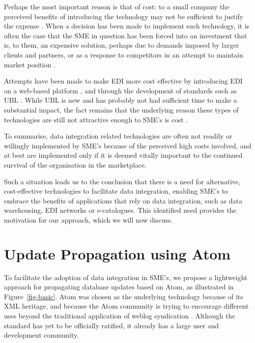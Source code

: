 \documentclass{CRPITStyle}
\begin{document}
Perhaps the most important reason is that of cost: to a small company
the perceived benefits of introducing the technology may not be
sufficient to justify the expense
\cite{Beck-R-2002-Bled,Guo-J-2003-DocEng,Somm-RA-2002-SIGMOD}. When a
decision has been made to implement such technology, it is often the
case that the SME in question has been forced into an investment that
is, to them, an expensive solution, perhaps due to demands imposed by
larger clients and partners, or as a response to competitors in an
attempt to maintain market position
\cite{Beck-R-2002-Bled,vaHe-E-1999-EDI}.

Attempts have been made to make EDI more cost effective by introducing
EDI on a web-based platform \cite{Beck-R-2002-Bled}, and through the
development of standards such as UBL \cite{Mead-B-2004-UBL}. While UBL
is new and has probably not had sufficient time to make a substantial
impact, the fact remains that the underlying reason these types of
technologies are still not attractive enough to SME's is cost
\cite{Beck-R-2002-Bled,Guo-J-2003-DocEng,Somm-RA-2002-SIGMOD,vaHe-E-1999-EDI}.

To summarise, data integration related technologies are often not
readily or willingly implemented by SME's because of the perceived high
costs involved, and at best are implemented only if it is deemed vitally
important to the continued survival of the organisation in the
marketplace.

Such a situation leads us to the conclusion that there is a need for
alternative, cost-effective technologies to facilitate data integration,
enabling SME's to embrace the benefits of applications that rely on data
integration, such as data warehousing, EDI networks or e-catalogues.
This identified need provides the motivation for our approach, which we
will now discuss.


\section{Update Propagation using Atom}
\label{sec-architecture}

To facilitate the adoption of data integration in SME's, we propose a
lightweight approach for propagating database updates based on Atom,
as illustrated in Figure~\ref{fig-basic}. Atom was chosen as the
underlying technology because of its XML heritage, and because the Atom
community is trying to encourage different uses beyond
the traditional application of weblog syndication
\cite{Nott-M-2005-Atom}. Although the standard has yet to be officially
ratified, it already has a large user and development community.
\end{document}
